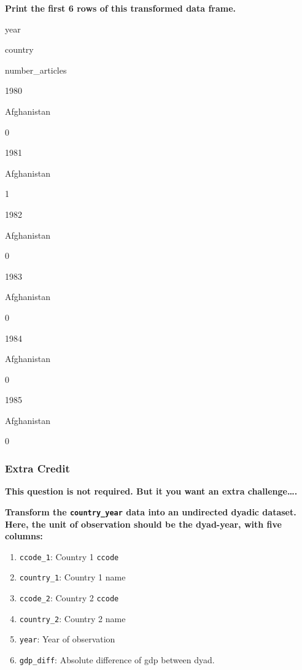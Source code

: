 \documentclass[]{book}
\newenvironment{Shaded}{\begin{snugshade}}{\end{snugshade}}
\newcommand{\KeywordTok}[1]{\textcolor[rgb]{0.13,0.29,0.53}{\textbf{#1}}}
\newcommand{\NormalTok}[1]{#1}
\newcommand{\OperatorTok}[1]{\textcolor[rgb]{0.81,0.36,0.00}{\textbf{#1}}}
\newcommand{\StringTok}[1]{\textcolor[rgb]{0.31,0.60,0.02}{#1}}
\providecommand{\tightlist}{%
  \setlength{\itemsep}{0pt}\setlength{\parskip}{0pt}}
\begin{document}
\textbf{Print the first 6 rows of this transformed data frame.}

\begin{Shaded}
\end{Shaded}

year

country

number\_articles

1980

Afghanistan

0

1981

Afghanistan

1

1982

Afghanistan

0

1983

Afghanistan

0

1984

Afghanistan

0

1985

Afghanistan

0

\hypertarget{extra-credit}{%
\subsubsection{Extra Credit}\label{extra-credit}}

\textbf{This question is not required. But it you want an extra challenge\ldots{}.}

\textbf{Transform the \texttt{country\_year} data into an undirected dyadic dataset. Here, the unit of observation should be the dyad-year, with five columns:}

\begin{enumerate}
\def\labelenumi{\arabic{enumi}.}
\tightlist
\item
  \texttt{ccode\_1}: Country 1 \texttt{ccode}
\item
  \texttt{country\_1}: Country 1 name
\item
  \texttt{ccode\_2}: Country 2 \texttt{ccode}
\item
  \texttt{country\_2}: Country 2 name
\item
  \texttt{year}: Year of observation
\item
  \texttt{gdp\_diff}: Absolute difference of gdp between dyad.
\end{enumerate}
\end{document}
